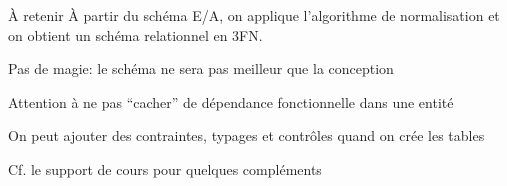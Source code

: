 \begin{frame}{À retenir}
À partir du schéma E/A, on applique l'algorithme de normalisation et on obtient
un schéma relationnel en 3FN.

\vfill

\begin{redbullet}
   \item Pas de magie: le schéma ne sera pas meilleur que la conception
   \item Attention à ne pas ``cacher'' de dépendance fonctionnelle dans une entité
   \item On peut ajouter des contraintes, typages et contrôles quand on crée les tables
\end{redbullet}

\vfill

Cf. le support de cours pour quelques compléments
\end{frame}

